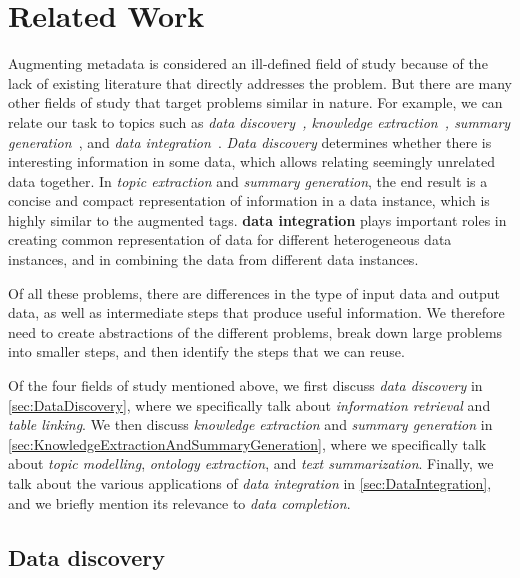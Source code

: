 
\chapter{Related Work}
\label{ch:RelatedWork}

Augmenting metadata is considered an ill-defined field of study because of the lack of existing literature that directly addresses the problem. But there are many other fields of study that target problems similar in nature. For example, we can relate our task to topics such as \textit{data discovery~\cite{Miller2018MakingOD}, knowledge extraction~\cite{Zhang2018Managing}, summary generation~\cite{Yu2006Schema}}, and \textit{data integration~\cite{Levy1996Querying}}. \textit{Data discovery} determines whether there is interesting information in some data, which allows relating seemingly unrelated data together. In \textit{topic extraction} and \textit{summary generation}, the end result is a concise and compact representation of information in a data instance, which is highly similar to the augmented tags. \textbf{\Gls{data integration}} plays important roles in creating common representation of data for different heterogeneous data instances, and in combining the data from different data instances.

Of all these problems, there are differences in the type of input data and output data, as well as intermediate steps that produce useful information. We therefore need to create abstractions of the different problems, break down large problems into smaller steps, and then identify the steps that we can reuse.

Of the four fields of study mentioned above, we first discuss \textit{data discovery} in \autoref{sec:DataDiscovery}, where we specifically talk about \textit{information retrieval} and \textit{table linking}. We then discuss \textit{knowledge extraction} and \textit{summary generation} in \autoref{sec:KnowledgeExtractionAndSummaryGeneration}, where we specifically talk about \textit{topic modelling}, \textit{ontology extraction}, and \textit{text summarization}. Finally, we talk about the various applications of \textit{data integration} in \autoref{sec:DataIntegration}, and we briefly mention its relevance to \textit{data completion}.

\section{Data discovery}
\label{sec:DataDiscovery}

